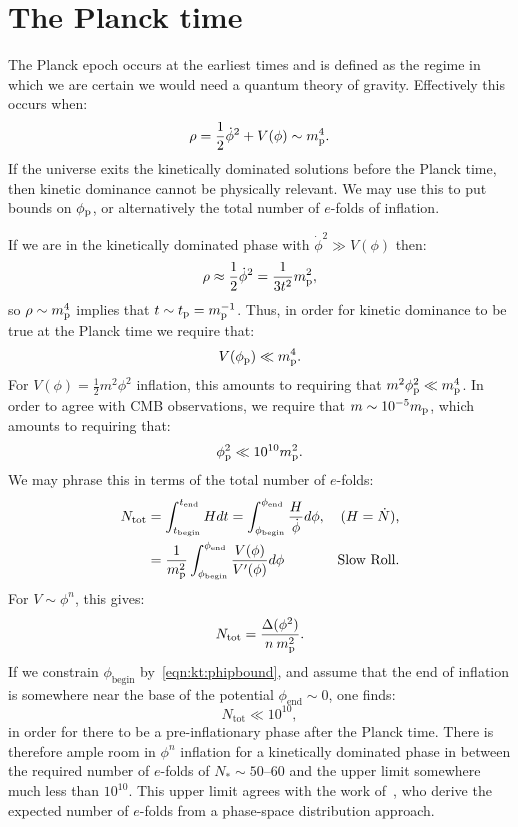 \section{The Planck time}
The Planck epoch occurs at the earliest times and is defined as the
regime in which we are certain we would need a quantum theory of
gravity. Effectively this occurs when:
\begin{equation}
  \rho = \frac{1}{2}\dot\phi^2 + V(\phi)  \sim m_{\mathrm{p}}^4.
  \label{eqn:kt:rhosim}
\end{equation}
If the universe exits the kinetically dominated solutions before the
Planck time, then kinetic dominance cannot be physically relevant. We
may use this to put bounds on \(\phi_{\mathrm{p}}\), or alternatively the total
number of \(e\)-folds of inflation.

If we are in the kinetically dominated phase with \(\dot{\phi}^2\gg
V(\phi)\) then:
\begin{equation}
  \rho \approx \frac{1}{2}\dot\phi^2= \frac{1}{3t^2}m_{\mathrm{p}}^2 ,
  \label{eqn:kt:rhop}
\end{equation}
so \(\rho\sim m_{\mathrm{p}}^4\) implies that \(t\sim t_{\mathrm{p}}=m_{\mathrm{p}}^{-1}\). Thus, in order for
kinetic dominance to be true at the Planck time we require that:
\begin{equation}
  V(\phi_{\mathrm{p}}) \ll m_{\mathrm{p}}^4.
\end{equation}
For \(V(\phi) = \frac{1}{2}m^2\phi^2\) inflation, this amounts to requiring that \(m^2\phi_{\mathrm{p}}^2\ll m_{\mathrm{p}}^4\). In order to agree with CMB observations, we require
that \(m\sim10^{-5}m_{\mathrm{p}}\), which amounts to requiring that:
\begin{equation}
 \phi_{\mathrm{p}}^2 \ll 10^{10}m_{\mathrm{p}}^2.
 \label{eqn:kt:phipbound}
\end{equation}
We may phrase this in terms of the total number of \(e\)-folds:
\begin{align}
  N_\mathrm{tot} 
  &=\int_{t_\mathrm{begin}}^{t_\mathrm{end}} H dt 
  =\int_{\phi_\mathrm{begin}}^{\phi_\mathrm{end}} 
       \frac{H}{\dot{\phi}}d\phi,  &\text{(\(H=\dot{N}\)),}
  \\
  &=\frac{1}{m_{\mathrm{p}}^2}\int_{\phi_\mathrm{begin}}^{\phi_\mathrm{end}}
     {\frac{V(\phi)}{V^\prime(\phi)}}d\phi &\text{Slow Roll.}
\end{align}
For \(V\sim\phi^n\), this gives:
\begin{equation}
  N_\mathrm{tot} = \frac{\Delta (\phi^2) }{n\:m_{\mathrm{p}}^2}.
\end{equation}
If we constrain \(\phi_\mathrm{begin}\) by~\eqref{eqn:kt:phipbound}, and assume that the end of inflation  is somewhere near the base of the potential \(\phi_\mathrm{end}\sim0\), one finds: 
\begin{equation}
  N_\mathrm{tot}\ll 10^{10},
\end{equation}
in order for there to be a pre-inflationary phase after the Planck time.
There is therefore ample room in \(\phi^n\) inflation for a kinetically dominated phase in between the required number of \(e\)-folds of \(N_*\sim50\)--\(60\) and the upper limit somewhere much less than \(10^{10}\). This upper limit agrees with the work of~\cite{how_many_e_folds}, who derive the expected number of \(e\)-folds from a phase-space distribution approach.

